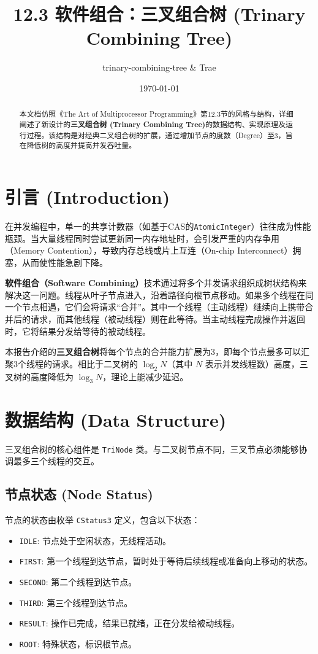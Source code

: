 \documentclass[UTF8,a4paper,12pt]{ctexart}
\title{\textbf{12.3 软件组合：三叉组合树 (Trinary Combining Tree)}}
\author{trinary-combining-tree \& Trae}
\date{\today}
\begin{document}
\maketitle

\begin{abstract}
本文档仿照《The Art of Multiprocessor Programming》第12.3节的风格与结构，详细阐述了新设计的\textbf{三叉组合树 (Trinary Combining Tree)}的数据结构、实现原理及运行过程。该结构是对经典二叉组合树的扩展，通过增加节点的度数（Degree）至3，旨在降低树的高度并提高并发吞吐量。
\end{abstract}

\tableofcontents
\newpage

\section{引言 (Introduction)}
在并发编程中，单一的共享计数器（如基于CAS的\texttt{AtomicInteger}）往往成为性能瓶颈。当大量线程同时尝试更新同一内存地址时，会引发严重的内存争用（Memory Contention），导致内存总线或片上互连（On-chip Interconnect）拥塞，从而使性能急剧下降。

\textbf{软件组合（Software Combining）}技术通过将多个并发请求组织成树状结构来解决这一问题。线程从叶子节点进入，沿着路径向根节点移动。如果多个线程在同一个节点相遇，它们会将请求“合并”。其中一个线程（主动线程）继续向上携带合并后的请求，而其他线程（被动线程）则在此等待。当主动线程完成操作并返回时，它将结果分发给等待的被动线程。

本报告介绍的\textbf{三叉组合树}将每个节点的合并能力扩展为3，即每个节点最多可以汇聚3个线程的请求。相比于二叉树的 $\log_2 N$（其中 $N$ 表示并发线程数）高度，三叉树的高度降低为 $\log_3 N$，理论上能减少延迟。

\section{数据结构 (Data Structure)}

三叉组合树的核心组件是 \texttt{TriNode} 类。与二叉树节点不同，三叉节点必须能够协调最多三个线程的交互。

\subsection{节点状态 (Node Status)}
节点的状态由枚举 \texttt{CStatus3} 定义，包含以下状态：
\begin{itemize}
    \item \texttt{IDLE}: 节点处于空闲状态，无线程活动。
    \item \texttt{FIRST}: 第一个线程到达节点，暂时处于等待后续线程或准备向上移动的状态。
    \item \texttt{SECOND}: 第二个线程到达节点。
    \item \texttt{THIRD}: 第三个线程到达节点。
    \item \texttt{RESULT}: 操作已完成，结果已就绪，正在分发给被动线程。
    \item \texttt{ROOT}: 特殊状态，标识根节点。
\end{itemize}
\end{document}
